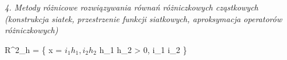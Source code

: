 \textit{4. Metody różnicowe rozwiązywania równań różniczkowych cząstkowych (konstrukcja siatek, przestrzenie funkcji siatkowych, aproksymacja operatorów różniczkowych)}


R^{2}_{h} = \{ x = \(i_{1}h_{1}, i_{2}h_{2}\) h_{1} h_{2} > 0, i_{1} i_{2} \in {}\}